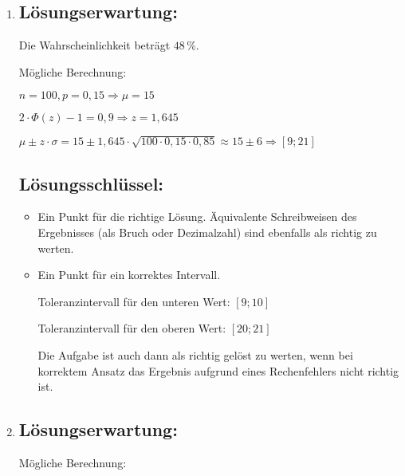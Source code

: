 \begin{langesbeispiel}
{\begin{enumerate}
	\subsection{Lösungsschlüssel:}
	\begin{itemize}
		\item  Ein Ausgleichspunkt für die ausschließliche Angabe der beiden Blutgruppen A und AB
		\item  Ein Punkt für die Angabe, dass die Aussage nicht richtig ist, und eine (sinngemäß) korrekte Begründung dafür.
	\end{itemize}
	
	\item \subsection{Lösungserwartung:}
			
		Die Wahrscheinlichkeit beträgt $48\,\%$.
		
		Mögliche Berechnung:
		
		$n=100, p=0,15 \Rightarrow \mu=15$
		
		$2\cdot\Phi(z)-1=0,9 \Rightarrow z=1,645$
		
		$\mu\pm z\cdot\sigma=15\pm 1,645\cdot\sqrt{100\cdot 0,15\cdot 0,85}\approx 15\pm 6 \Rightarrow [9;21]$

	\subsection{Lösungsschlüssel:}
	
\begin{itemize}
	\item Ein Punkt für die richtige Lösung. Äquivalente Schreibweisen des Ergebnisses (als Bruch oder Dezimalzahl) sind ebenfalls als richtig zu werten. 
	\item Ein Punkt für ein korrektes Intervall.  
	
	Toleranzintervall für den unteren Wert: $[9; 10]$  
	
	Toleranzintervall für den oberen Wert: $[20; 21]$  
	
	Die Aufgabe ist auch dann als richtig gelöst zu werten, wenn bei korrektem Ansatz das Ergebnis aufgrund eines Rechenfehlers nicht richtig ist.
\end{itemize}

\item \subsection{Lösungserwartung:}
	Mögliche Berechnung:
	

\end{enumerate}}
\end{langesbeispiel}
